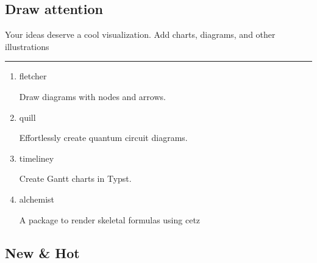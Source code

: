 \subsection{Draw attention}\label{draw-attention}

Your ideas deserve a cool visualization. Add charts, diagrams, and other
illustrations

\begin{center}\rule{0.5\linewidth}{0.5pt}\end{center}

\begin{enumerate}
\item
  \href{https://typst.app/universe/package/fletcher/}{}

  fletcher

  Draw diagrams with nodes and arrows.

  
\item
  \href{https://typst.app/universe/package/quill/}{}

  quill

  Effortlessly create quantum circuit diagrams.

  
\item
  \href{https://typst.app/universe/package/timeliney/}{}

  timeliney

  Create Gantt charts in Typst.

  
\item
  \href{https://typst.app/universe/package/alchemist/}{}

  alchemist

  A package to render skeletal formulas using cetz

  
\end{enumerate}

\subsection[ New \&
Hot]{\texorpdfstring{\protect
New \& Hot}{Icon New \& Hot}}\label{icon-new-hot}

